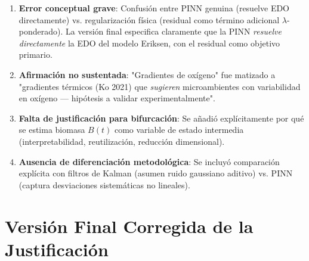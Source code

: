 \documentclass[12pt,oneside]{book}
\newcommand{\critical}[1]{\textcolor{criticalred}{\textbf{#1}}}
\begin{document}
\begin{enumerate}
    \item \critical{Error conceptual grave}: Confusión entre PINN genuina (resuelve EDO directamente) vs. regularización física (residual como término adicional $\lambda$-ponderado). La versión final especifica claramente que la PINN \textit{resuelve directamente} la EDO del modelo Eriksen, con el residual como objetivo primario.
    
    \item \critical{Afirmación no sustentada}: "Gradientes de oxígeno" fue matizado a "gradientes térmicos (Ko 2021) que \textit{sugieren} microambientes con variabilidad en oxígeno --- hipótesis a validar experimentalmente".
    
    \item \critical{Falta de justificación para bifurcación}: Se añadió explícitamente por qué se estima biomasa $B(t)$ como variable de estado intermedia (interpretabilidad, reutilización, reducción dimensional).
    
    \item \critical{Ausencia de diferenciación metodológica}: Se incluyó comparación explícita con filtros de Kalman (asumen ruido gaussiano aditivo) vs. PINN (captura desviaciones sistemáticas no lineales).
\end{enumerate}

\section{Versión Final Corregida de la Justificación}
\end{document}
